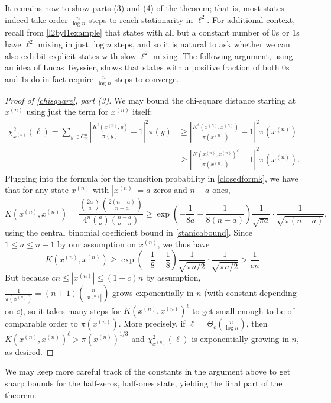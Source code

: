 \documentclass[11pt]{article}
\newcounter{r}
\newcounter{s}
\numberwithin{equation}{section}
\begin{document}
It remains now to show parts (3) and (4) of the theorem; that is, most states indeed take order $\frac{n}{\log n}$ steps to reach stationarity in $\ell^2$. For additional context, recall from \cref{l2byl1example} that states with all but a constant number of $0$s or $1$s have $\ell^2$ mixing in just $\log n$ steps, and so it is natural to ask whether we can also exhibit explicit states with slow $\ell^2$ mixing. The following argument, using an idea of Lucas Teyssier, shows that states with a positive fraction of both $0$s and $1$s do in fact require $\frac{n}{\log n}$ steps to converge.

\begin{proof}[Proof of \cref{chisquare}, part (3)]
We may bound the chi-square distance starting at $x^{(n)}$ using just the term for $x^{(n)}$ itself:
\begin{align*}
    \chi_{x^{(n)}}^2(\ell) = \sum_{y \in C_2^n} \left|\frac{K^\ell(x^{(n)}, y)}{\pi(y)} - 1\right|^2 \pi(y) &\ge \left|\frac{K^\ell(x^{(n)}, x^{(n)})}{\pi(x^{(n)})} - 1\right|^2\pi(x^{(n)}) \\
    &\ge \left|\frac{K\left(x^{(n)}, x^{(n)}\right)^\ell}{\pi(x^{(n)})} - 1\right|^2 \pi(x^{(n)}).
\end{align*}
Plugging into the formula for the transition probability in \cref{closedformk}, we have that for any state $x^{(n)}$ with $|x^{(n)}| = a$ zeros and $n-a$ ones,
\[
    K(x^{(n)}, x^{(n)}) = \frac{\binom{2a}{a}\binom{2(n-a)}{n-a}}{4^n \binom{a}{a} \binom{n-a}{n-a}} \ge \exp\left(-\frac{1}{8a} - \frac{1}{8(n-a)}\right) \frac{1}{\sqrt{\pi a}} \cdot \frac{1}{\sqrt{\pi (n-a)}},
\]
using the central binomial coefficient bound in \cref{stanicabound}. Since $1 \le a \le n-1$ by our assumption on $x^{(n)}$, we thus have
\[
    K(x^{(n)}, x^{(n)}) \ge \exp\left(-\frac{1}{8} - \frac{1}{8}\right) \frac{1}{\sqrt{\pi n/2}} \cdot \frac{1}{\sqrt{\pi n/2}} > \frac{1}{en}.
\]
But because $cn \le |x^{(n)}| \le (1-c)n$ by assumption, $\frac{1}{\pi(x^{(n)})} = (n+1) \binom{n}{|x^{(n)}|}$ grows exponentially in $n$ (with constant depending on $c$), so it takes many steps for $K\left(x^{(n)}, x^{(n)}\right)^\ell$ to get small enough to be of comparable order to $\pi(x^{(n)})$. More precisely, if $\ell = \Theta_c\left(\frac{n}{\log n}\right)$, then $K(x^{(n)}, x^{(n)})^\ell > \pi(x^{(n)})^{1/3}$ and $\chi_{x^{(n)}}^2(\ell)$ is exponentially growing in $n$, as desired.
\end{proof}

We may keep more careful track of the constants in the argument above to get sharp bounds for the half-zeros, half-ones state, yielding the final part of the theorem:
\end{document}
